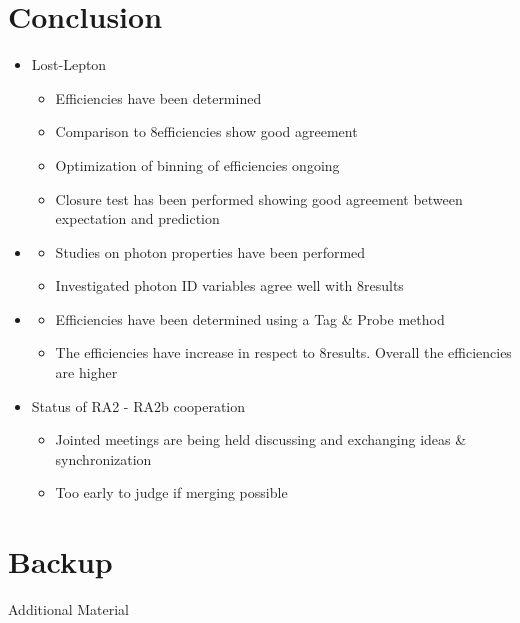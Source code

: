 \documentclass{beamer}
\begin{document}
\section{Conclusion}
\begin{frame}

\begin{itemize}
 \item Lost-Lepton
 \begin{itemize}
  \item Efficiencies have been determined
  \item Comparison to 8\tev efficiencies show good agreement
  \item Optimization of binning of efficiencies ongoing
  \item Closure test has been performed showing good agreement between expectation and prediction
 \end{itemize}
  \item \photonJets
 \begin{itemize}
  \item Studies on photon properties have been performed
  \item Investigated photon ID variables agree well with 8\tev results
 \end{itemize}
 \item \Zll
 \begin{itemize}
  \item Efficiencies have been determined using a Tag \& Probe method
  \item The efficiencies have increase in respect to 8\tev results. Overall the efficiencies are higher
 \end{itemize}
 \item Status of RA2 - RA2b cooperation
 \begin{itemize}
  \item Jointed meetings are being held discussing and exchanging ideas \& synchronization
  \item Too early to judge if merging possible
 \end{itemize}

 
\end{itemize}


\end{frame}
\section{Backup}
\begin{frame}
  \begin{center}
    {\Large Additional Material}
  \end{center}
\end{frame}
\end{document}
